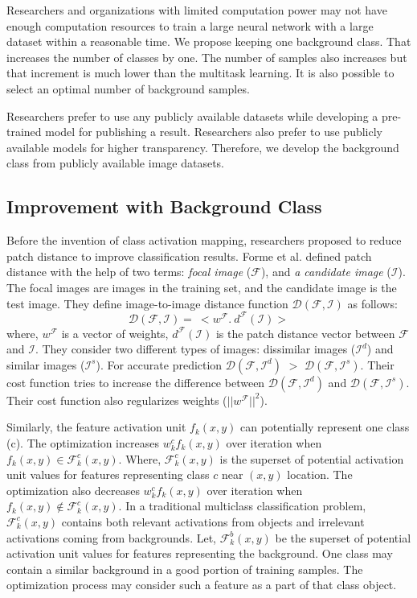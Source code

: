 \documentclass{article}
\begin{document}
Researchers and organizations with limited computation power may not have enough computation resources to train a large neural network with a large dataset within a reasonable time. We propose keeping one background class. That increases the number of classes by one. The number of samples also increases but that increment is much lower than the multitask learning. It is also possible to select an optimal number of background samples.  

Researchers prefer to use any publicly available datasets while developing a pre-trained model for publishing a result. Researchers also prefer to use publicly available models for higher transparency. Therefore, we develop the background class from publicly available image datasets.  

\subsection{Improvement with Background Class}
Before the invention of class activation mapping, researchers proposed to reduce patch distance \cite{zuo2014learning, frome2006image} to improve classification results. Forme et al. \cite{frome2006image} defined patch distance with the help of two terms: \emph{focal image} ($\mathcal{F}$), and \emph{a candidate image} ($\mathcal{I}$). The focal images are images in the training set, and the candidate image is the test image. They define image-to-image
distance function $\mathcal{D}(\mathcal{F},\mathcal{I})$ as follows:
\begin{equation}
\mathcal{D}(\mathcal{F},\mathcal{I}) = \ <w^\mathcal{F} . \ d^\mathcal{F} (\mathcal{I})>
        \label{PDt}
\end{equation}
where, $w^\mathcal{F}$ is a vector of weights, $d^\mathcal{F} (\mathcal{I})$ is the patch distance vector between $\mathcal{F}$ and $\mathcal{I}$.
They consider two different types of images: dissimilar images ($\mathcal{I}^d$) and similar images ($\mathcal{I}^s$). For accurate prediction $\mathcal{D}(\mathcal{F},\mathcal{I}^d)$ $>$ $\mathcal{D}(\mathcal{F},\mathcal{I}^s)$. Their cost function tries to increase the difference between $\mathcal{D}(\mathcal{F},\mathcal{I}^d)$ and $\mathcal{D}(\mathcal{F},\mathcal{I}^s)$. Their cost function also regularizes weights ($||w^\mathcal{F}||^2$).

Similarly, the feature activation unit $f_k (x,y)$ can potentially represent one class (c). The optimization increases $w_k^c f_k (x,y)$ over iteration when $f_k (x,y) \in \mathcal{F}_k^c (x,y)$. Where, $\mathcal{F}_k^c (x,y)$ is the superset of potential activation unit values for features representing class $c$ near $(x,y)$ location. The optimization also decreases $w_k^c f_k (x,y)$ over iteration when $f_k (x,y) \notin \mathcal{F}_k^c (x,y)$. In a traditional multiclass classification problem, $\mathcal{F}_k^c (x,y)$ contains both relevant activations from objects and irrelevant activations coming from backgrounds. Let, $\mathcal{F}_k^b (x,y)$ be the superset of potential activation unit values for features representing the background. One class may contain a similar background in a good portion of training samples. The optimization process may consider such a feature as a part of that class object. 
\end{document}
